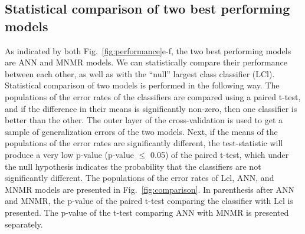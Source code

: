 \documentclass[10pt, paper=a4]{article}
\begin{document}
\subsection{Statistical comparison of two best performing models}
As indicated by both Fig.~\ref{fig:performance}e-f, the two best
performing models are ANN and MNMR models.  We can statistically
compare their performance between each other, as well as with the
``null'' largest class classifier (LCl).  Statistical comparison of
two models is performed in the following way.  The populations of the
error rates of the classifiers are compared using a paired t-test, and
if the difference in their means is significantly non-zero, then one
classifier is better than the other.  The outer layer of the
cross-validation is used to get a sample of generalization errors of
the two models.  Next, if the means of the populations of the error
rates are significantly different, the test-statistic will produce a
very low p-value (p-value $\leq$ 0.05) of the paired t-test, which
under the null hypothesis indicates the probability that the
classifiers are not significantly different.  The populations of the
error rates of Lcl, ANN, and MNMR models are presented in
Fig.~\ref{fig:comparison}.  In parenthesis after ANN and MNMR, the
p-value of the paired t-test comparing the classifier with Lcl is
presented.  The p-value of the t-test comparing ANN with MNMR is
presented separately.
\end{document}
